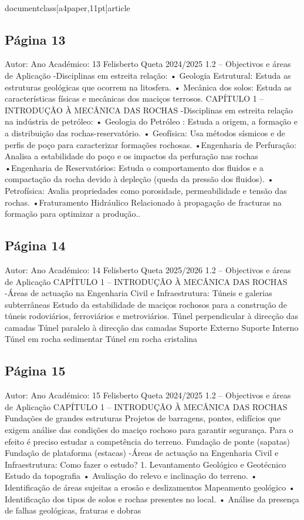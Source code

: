 \\documentclass[a4paper,11pt]{article}
\begin{document}
\subsection*{Página 13}
Autor:
Ano Académico:
13
Felisberto Queta
2024/2025
1.2 – Objectivos e áreas de Aplicação
-Disciplinas em estreita relação:
• Geologia Estrutural:
Estuda as estruturas geológicas que ocorrem na litosfera.
• Mecânica dos solos:
Estuda as características físicas e mecânicas dos maciços terrosos.
CAPÍTULO 1 – INTRODUÇÃO À MECÂNICA DAS ROCHAS
-Disciplinas em estreita relação na indústria de petróleo:
• Geologia do Petróleo :
Estuda a origem, a formação e a distribuição das rochas-reservatório.
• Geofísica:
Usa métodos sísmicos e de perfis de poço para caracterizar formações rochosas.
•Engenharia
de
Perfuração:
Analisa a estabilidade do poço e os impactos da perfuração nas rochas
•Engenharia
de
Reservatórios:
Estuda o comportamento dos fluidos e a compactação da rocha devido à depleção (queda
da pressão dos fluidos).
• Petrofísica:
Avalia propriedades como porosidade, permeabilidade e tensão das rochas.
•Fraturamento Hidráulico
Relacionado à propagação de fracturas na formação para optimizar a produção..



\subsection*{Página 14}
Autor:
Ano Académico:
14
Felisberto Queta
2025/2026
1.2 – Objectivos e áreas de Aplicação
CAPÍTULO 1 – INTRODUÇÃO À MECÂNICA DAS ROCHAS
-Áreas de actuação na Engenharia Civil e 
Infraestrutura:
Túneis
e
galerias
subterrâneas
Estudo da estabilidade de maciços rochosos para a construção de túneis rodoviários,
ferroviários e metroviários.
Túnel perpendicular à direcção das 
camadas
Túnel paralelo à direcção das 
camadas
Suporte Externo
Suporte Interno
Túnel em rocha 
sedimentar
Túnel em rocha 
cristalina



\subsection*{Página 15}
Autor:
Ano Académico:
15
Felisberto Queta
2024/2025
1.2 – Objectivos e áreas de Aplicação
CAPÍTULO 1 – INTRODUÇÃO À MECÂNICA DAS ROCHAS
Fundações de grandes estruturas
Projetos de barragens, pontes, edifícios que exigem análise
das condições do maciço rochoso para garantir segurança.
Para o efeito é preciso estudar a competência do terreno.
Fundação de ponte (sapatas)
Fundação de plataforma (estacas)
-Áreas de actuação na Engenharia Civil e 
Infraestrutura:
Como fazer o estudo?
1. Levantamento Geológico e Geotécnico
Estudo da topografia
•
Avaliação do relevo e inclinação do terreno.
•
Identificação de áreas sujeitas a erosão e deslizamentos
Mapeamento geológico
•
Identificação dos tipos de solos e rochas presentes no local.
•
Análise da presença de falhas geológicas, fraturas e dobras
\end{document}
